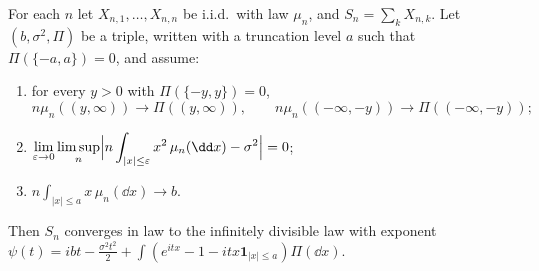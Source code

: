 \begin{theorem}\label{thm:arrays}
For each $n$ let $X_{n,1},\dots,X_{n,n}$ be i.i.d.\ with law $\mu_n$, and $S_n=\sum_kX_{n,k}$. Let $(b,\sigma^2,\Pi)$ be a triple, written with a truncation level
$a$ such that $\Pi(\{-a,a\})=0$, and assume:
\begin{enumerate}[label=(\roman*)]
\item for every $y>0$ with $\Pi(\{-y,y\})=0$,
\[
n\mu_n((y,\infty))\to\Pi((y,\infty)),\qquad n\mu_n((-\infty,-y))\to\Pi((-\infty,-y));
\]
\item $\displaystyle\lim_{\varepsilon\to0}\limsup_n\Bigl|n\int_{|x|\le\varepsilon}x^2\,\mu_n(\dd x)-\sigma^2\Bigr|=0$;
\item $n\int_{|x|\le a}x\,\mu_n(\dd x)\to b$.
\end{enumerate}
Then $S_n$ converges in law to the infinitely divisible law with exponent $\psi(t)=ibt-\frac{\sigma^2t^2}2+\int(e^{itx}-1-itx\mathbf 1_{|x|\le a})\Pi(\dd x)$.
\end{theorem}

